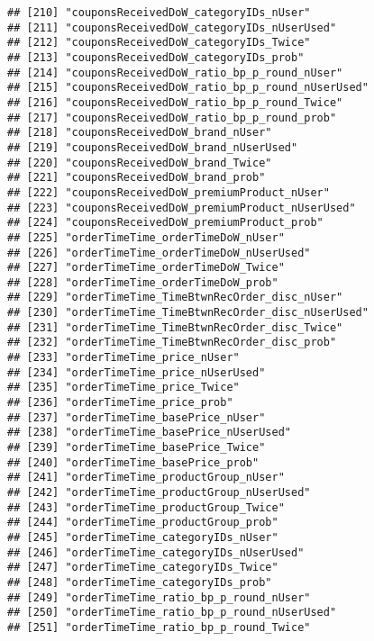 \documentclass[10pt]{report}
\begin{document}
\begin{verbatim}
## [210] "couponsReceivedDoW_categoryIDs_nUser"               
## [211] "couponsReceivedDoW_categoryIDs_nUserUsed"           
## [212] "couponsReceivedDoW_categoryIDs_Twice"               
## [213] "couponsReceivedDoW_categoryIDs_prob"                
## [214] "couponsReceivedDoW_ratio_bp_p_round_nUser"          
## [215] "couponsReceivedDoW_ratio_bp_p_round_nUserUsed"      
## [216] "couponsReceivedDoW_ratio_bp_p_round_Twice"          
## [217] "couponsReceivedDoW_ratio_bp_p_round_prob"           
## [218] "couponsReceivedDoW_brand_nUser"                     
## [219] "couponsReceivedDoW_brand_nUserUsed"                 
## [220] "couponsReceivedDoW_brand_Twice"                     
## [221] "couponsReceivedDoW_brand_prob"                      
## [222] "couponsReceivedDoW_premiumProduct_nUser"            
## [223] "couponsReceivedDoW_premiumProduct_nUserUsed"        
## [224] "couponsReceivedDoW_premiumProduct_prob"             
## [225] "orderTimeTime_orderTimeDoW_nUser"                   
## [226] "orderTimeTime_orderTimeDoW_nUserUsed"               
## [227] "orderTimeTime_orderTimeDoW_Twice"                   
## [228] "orderTimeTime_orderTimeDoW_prob"                    
## [229] "orderTimeTime_TimeBtwnRecOrder_disc_nUser"          
## [230] "orderTimeTime_TimeBtwnRecOrder_disc_nUserUsed"      
## [231] "orderTimeTime_TimeBtwnRecOrder_disc_Twice"          
## [232] "orderTimeTime_TimeBtwnRecOrder_disc_prob"           
## [233] "orderTimeTime_price_nUser"                          
## [234] "orderTimeTime_price_nUserUsed"                      
## [235] "orderTimeTime_price_Twice"                          
## [236] "orderTimeTime_price_prob"                           
## [237] "orderTimeTime_basePrice_nUser"                      
## [238] "orderTimeTime_basePrice_nUserUsed"                  
## [239] "orderTimeTime_basePrice_Twice"                      
## [240] "orderTimeTime_basePrice_prob"                       
## [241] "orderTimeTime_productGroup_nUser"                   
## [242] "orderTimeTime_productGroup_nUserUsed"               
## [243] "orderTimeTime_productGroup_Twice"                   
## [244] "orderTimeTime_productGroup_prob"                    
## [245] "orderTimeTime_categoryIDs_nUser"                    
## [246] "orderTimeTime_categoryIDs_nUserUsed"                
## [247] "orderTimeTime_categoryIDs_Twice"                    
## [248] "orderTimeTime_categoryIDs_prob"                     
## [249] "orderTimeTime_ratio_bp_p_round_nUser"               
## [250] "orderTimeTime_ratio_bp_p_round_nUserUsed"           
## [251] "orderTimeTime_ratio_bp_p_round_Twice"               

\end{verbatim}
\end{document}
